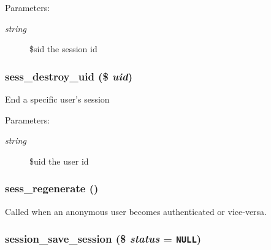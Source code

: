 \begin{Desc}
\item[Parameters:]
\begin{description}
\item[{\em string}]\$sid the session id \end{description}
\end{Desc}
\hypertarget{session_8inc_599b7909c42608adabc65b7fa3b00864}{
\subsubsection[{sess\_\-destroy\_\-uid}]{\setlength{\rightskip}{0pt plus 5cm}sess\_\-destroy\_\-uid (\$ {\em uid})}}
\label{session_8inc_599b7909c42608adabc65b7fa3b00864}


End a specific user's session

\begin{Desc}
\item[Parameters:]
\begin{description}
\item[{\em string}]\$uid the user id \end{description}
\end{Desc}
\hypertarget{session_8inc_621c1d926868f31898dbf7c90c82620d}{
\subsubsection[{sess\_\-regenerate}]{\setlength{\rightskip}{0pt plus 5cm}sess\_\-regenerate ()}}
\label{session_8inc_621c1d926868f31898dbf7c90c82620d}


Called when an anonymous user becomes authenticated or vice-versa. \hypertarget{session_8inc_3b87e39800b48ccf96e034198ec2317b}{
\subsubsection[{session\_\-save\_\-session}]{\setlength{\rightskip}{0pt plus 5cm}session\_\-save\_\-session (\$ {\em status} = {\tt NULL})}}
\label{session_8inc_3b87e39800b48ccf96e034198ec2317b}


